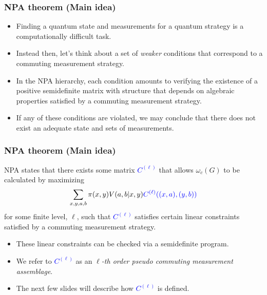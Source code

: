 \documentclass{beamer}
\newcommand{\comment}[1]{\textcolor{blue}{%
  \begin{quote}\sf [*** #1 ***]\end{quote}}}
\begin{document}
\begin{frame}
	\frametitle{NPA theorem (Main idea)}
	\begin{itemize}
		\item Finding a quantum state and measurements for a quantum strategy is a computationally difficult task. 
		\pause
		\item Instead then, let's think about a set of \emph{weaker} conditions that correspond to a commuting measurement strategy. 
		\pause
		\item In the NPA hierarchy, each condition amounts to verifying the existence of a positive semidefinite matrix with structure that depends on algebraic properties satisfied by a commuting measurement strategy. 
		\pause
		\item If any of these conditions are violated, we may conclude that there does not exist an adequate state and sets of measurements. 
	\end{itemize}
\end{frame}   

\begin{frame}
	\frametitle{NPA theorem (Main idea)}
	NPA states that there exists some matrix \textcolor{blue}{$C^{(\ell)}$} that allows $\omega_c(G)$ to be calculated by maximizing
	\begin{align*}
		\sum_{x,y,a,b} \pi(x,y) V(a,b|x,y) \textcolor{blue}{C^{(\ell)}((x,a),(y,b))}
	\end{align*}
	for some finite level, $\ell$, such that \textcolor{blue}{$C^{(\ell)}$} satisfies certain linear constraints satisfied by a commuting measurement strategy. 
	\vspace{5mm}
	
	\begin{itemize}
		\item These linear constraints can be checked via a semidefinite program.
		\item We refer to \textcolor{blue}{$C^{(\ell)}$} as an \emph{$\ell$-th order pseudo commuting measurement assemblage}.
		\item The next few slides will describe how \textcolor{blue}{$C^{(\ell)}$} is defined.
	\end{itemize}
	
\end{frame}

\end{document}
